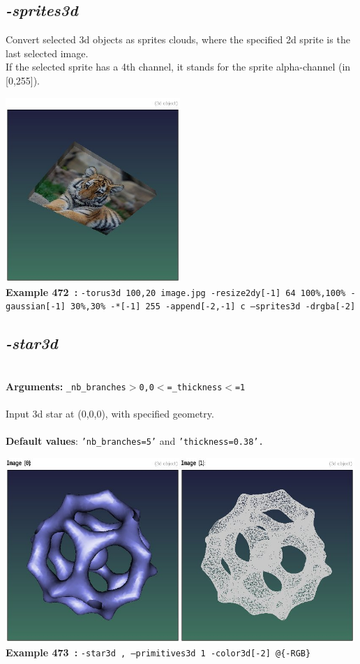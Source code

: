 \documentclass[a4paper,11pt,twoside]{book}
\begin{document}
\subsection{\emph{-sprites3d} }\vspace*{-0.5em}
Convert selected 3d objects as sprites clouds, where the specified 2d sprite is the last selected image.
~\\If the selected sprite has a 4th channel, it stands for the sprite alpha-channel (in [0,255]).
\begin{center}\includegraphics[keepaspectratio=true,height=7cm,width=\textwidth]{img/gmic_def472.jpg}\\
{\footnotesize \textbf{Example 472~:} \texttt{-torus3d 100,20 image.jpg -resize2dy[-1] 64 100\%,100\% -gaussian[-1] 30\%,30\% -*[-1] 255 -append[-2,-1] c --sprites3d -drgba[-2]}}
\end{center}

\subsection{\emph{-star3d} }\vspace*{-0.5em}
~\\\textbf{Arguments: } 
{\small \texttt{\_nb\_branches$>$0,0$<$=\_thickness$<$=1}}\\~\\
Input 3d star at (0,0,0), with specified geometry.
~\\~\\\textbf{Default values}: {\small \texttt{'nb\_branches=5'} and \texttt{'thickness=0.38'.}}
\begin{center}\includegraphics[keepaspectratio=true,height=7cm,width=\textwidth]{img/gmic_def473.jpg}\\
{\footnotesize \textbf{Example 473~:} \texttt{-star3d , --primitives3d 1 -color3d[-2] @\{-RGB\}}}
\end{center}
\end{document}

